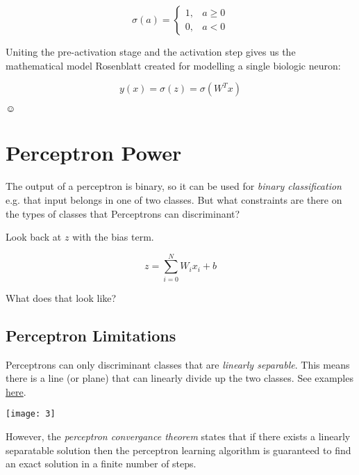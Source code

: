 \documentclass[letterpaper,12pt]{article}
\begin{document}
\[
    \sigma(a) =
    \begin{cases}
        1, & a \ge 0\\
        0, & a < 0
    \end{cases}
\]

Uniting the pre-activation stage and the activation step gives us the
mathematical model Rosenblatt created for modelling a single biologic neuron:

\[
    y(x) = \sigma(z) =  \sigma(W^{T}x)
\]

$\smiley$

\section{Perceptron Power}

The output of a perceptron is binary, so it can be used for \emph{binary
classification} e.g. that input belongs in one of two classes. But what
constraints are there on the types of classes that Perceptrons can discriminant?

Look back at $z$ with the bias term.

\[
    z = \sum_{i=0}^{N} W_i x_i + b
\]

What does that look like?

\subsection{Perceptron Limitations}

Perceptrons can only discriminant classes that are \emph{linearly separable}.
This means there is a line (or plane) that can linearly divide up the two
classes. See examples \href{https://en.wikipedia.org/wiki/Linear_separability}{here}.

\texttt{[image: 3]}

However, the \emph{perceptron convergance theorem} states that if there exists
a linearly separatable solution then the perceptron learning algorithm is
guaranteed to find an exact solution in a finite number of steps.
\end{document}
